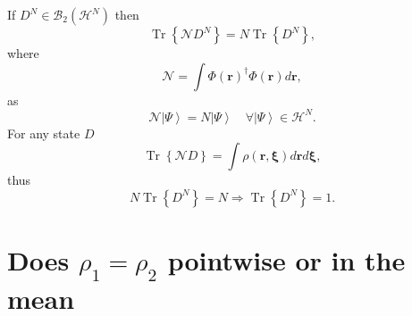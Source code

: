 \documentclass[aps,preprint]{revtex4}%
\begin{document}
If $D^{N}\in\mathcal{B}_{2}\left(  \mathcal{H}^{N}\right)  $ then
\begin{equation}
\operatorname{Tr}\left\{  \mathcal{N}D^{N}\right\}  =N\operatorname{Tr}%
\left\{  D^{N}\right\}  ,
\end{equation}
where
\begin{equation}
\mathcal{N}=\int\Phi\left(  \boldsymbol{r}\right)  ^{\dagger}\Phi\left(
\boldsymbol{r}\right)  d\boldsymbol{r,}%
\end{equation}
as
\begin{equation}
\mathcal{N}\left\vert \Psi\right\rangle =N\left\vert \Psi\right\rangle
\quad\forall\left\vert \Psi\right\rangle \in\mathcal{H}^{N}.
\end{equation}
For any state $D$
\begin{equation}
\operatorname{Tr}\left\{  \mathcal{N}D\right\}  =\int\rho\left(
\boldsymbol{r,\xi}\right)  d\boldsymbol{r}d\boldsymbol{\xi,}%
\end{equation}
thus
\begin{equation}
N\operatorname{Tr}\left\{  D^{N}\right\}  =N\Rightarrow\operatorname{Tr}%
\left\{  D^{N}\right\}  =1.
\end{equation}


\section{Does $\rho_{1}=\rho_{2}$ pointwise or in the mean}
\end{document}
